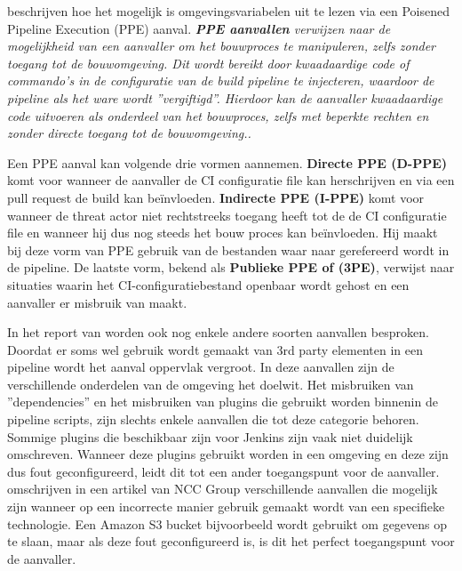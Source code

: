 \textcite{Security2022} beschrijven hoe het mogelijk is omgevingsvariabelen uit te lezen via een Poisened Pipeline Execution (PPE) aanval. {\centering\textit{\textbf{PPE aanvallen} verwijzen naar de mogelijkheid van een aanvaller om het bouwproces te manipuleren, zelfs zonder toegang tot de bouwomgeving. Dit wordt bereikt door kwaadaardige code of commando's in de configuratie van de build pipeline te injecteren, waardoor de pipeline als het ware wordt ''vergiftigd''. Hierdoor kan de aanvaller kwaadaardige code uitvoeren als onderdeel van het bouwproces, zelfs met beperkte rechten en zonder directe toegang tot de bouwomgeving.. \autocite{Security2022}}}
\clearpage

Een PPE aanval kan volgende drie vormen aannemen. \textbf{Directe PPE (D-PPE)} komt voor wanneer de aanvaller de CI configuratie file kan herschrijven en via een pull request de build kan beïnvloeden. \textbf{Indirecte PPE (I-PPE)} komt voor wanneer de threat actor niet rechtstreeks toegang heeft tot de de CI configuratie file en wanneer hij dus nog steeds het bouw proces kan beïnvloeden. Hij maakt bij deze vorm van PPE gebruik van de bestanden waar naar gerefereerd wordt in de pipeline. De laatste vorm, bekend als \textbf{Publieke PPE of (3PE)}, verwijst naar situaties waarin het CI-configuratiebestand openbaar wordt gehost en een aanvaller er misbruik van maakt. \autocite{Security2022}
\newline

In het report van \textcite{Security2022} worden ook nog enkele andere soorten aanvallen besproken. Doordat er soms wel gebruik wordt gemaakt van 3rd party elementen in een pipeline wordt het aanval oppervlak vergroot. In deze aanvallen zijn de verschillende onderdelen van de omgeving het doelwit. Het misbruiken van ''dependencies'' en het misbruiken van plugins die gebruikt worden binnenin de pipeline scripts, zijn slechts enkele aanvallen die tot deze categorie behoren. Sommige plugins die beschikbaar zijn voor Jenkins zijn vaak niet duidelijk omschreven. Wanneer deze plugins gebruikt worden in een omgeving en deze zijn dus fout geconfigureerd, leidt dit tot een ander toegangspunt voor de aanvaller. \autocite{Haymore2022} omschrijven in een artikel van NCC Group verschillende aanvallen die mogelijk zijn wanneer op een incorrecte manier gebruik gemaakt wordt van een specifieke technologie. Een Amazon S3 bucket bijvoorbeeld wordt gebruikt om gegevens op te slaan, maar als deze fout geconfigureerd is, is dit het perfect toegangspunt voor de aanvaller. 

